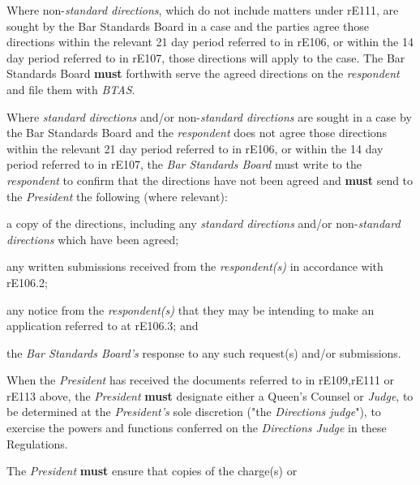 \par
Where non-\emph{standard directions}, which do not include matters under
rE111, are sought by the Bar Standards Board in a case and the parties
agree those directions within the relevant 21 day period referred to in
rE106, or within the 14 day period referred to in rE107, those
directions will apply to the case. The Bar Standards Board  \textcolor{myred}{\textbf{must}}
forthwith serve the agreed directions on the \emph{respondent} and file
them with \emph{BTAS}.\\
\par
{}
Where \emph{standard directions} and/or non-\emph{standard
directions} are sought in a case by the Bar Standards Board and
the \emph{respondent} does not agree those directions within the
relevant 21 day period referred to in rE106, or within the 14 day period
referred to in rE107, the \emph{Bar Standards Board }must write to
the \emph{respondent} to confirm that the directions have not been
agreed and  \textcolor{myred}{\textbf{must}} send to the \emph{President} the following (where
relevant):\\\nl \item a copy of the directions, including any \emph{standard
directions} and/or non-\emph{standard directions} which have been
agreed;\item any written submissions received from the \emph{respondent(s)} in
accordance with rE106.2;\item any notice from the \emph{respondent(s)} that they may be intending
to make an application referred to at rE106.3; and\item the \emph{Bar Standards Board's} response to any such request(s)
and/or submissions.\ln
{}\par
{}
When the \emph{President }has received the documents referred to in
rE109,rE111 or rE113 above, the \emph{President}  \textcolor{myred}{\textbf{must}} designate either a
Queen's Counsel or \emph{Judge}, to be determined at
the \emph{President's} sole discretion ("the \emph{Directions judge}"),
to exercise the powers and functions conferred on the \emph{Directions
Judge} in these Regulations.\\
\par
The \emph{President}  \textcolor{myred}{\textbf{must}} ensure that copies of the charge(s) or
